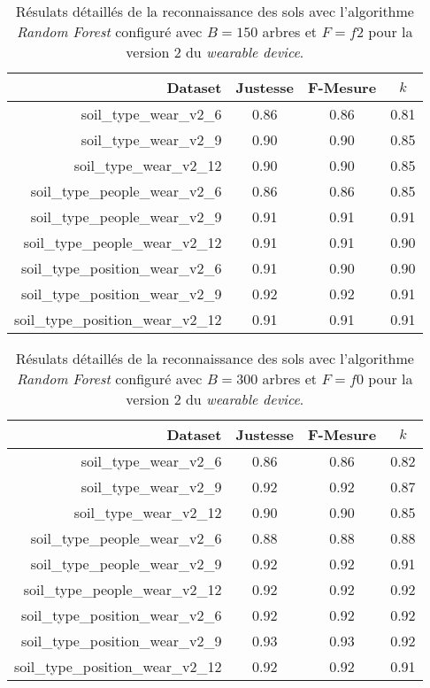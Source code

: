 \begin{table}[H]\renewcommand{\arraystretch}{0.5}
	\centering
	\caption{Résulats détaillés de la reconnaissance des sols avec l'algorithme \textit{Random Forest} configuré avec $B=150$ arbres et $F=f2$ pour la version 2 du \textit{wearable device}.}
	\label{tab:tab:rf-150-f2-wear-v2}
	\begin{tabular}{@{}rccc@{}}
		\toprule
			\textbf{Dataset} & \textbf{Justesse} & \textbf{F-Mesure} & \textbf{$k$} \\
		\midrule
			soil\_type\_wear\_v2\_6 & 0.86 & 0.86 & 0.81 \\
			soil\_type\_wear\_v2\_9 & 0.90 & 0.90 & 0.85 \\
			soil\_type\_wear\_v2\_12 & 0.90 & 0.90 & 0.85 \\
			soil\_type\_people\_wear\_v2\_6 & 0.86 & 0.86 & 0.85 \\
			soil\_type\_people\_wear\_v2\_9 & 0.91 & 0.91 & 0.91 \\
			soil\_type\_people\_wear\_v2\_12 & 0.91 & 0.91 & 0.90 \\
			soil\_type\_position\_wear\_v2\_6 & 0.91 & 0.90 & 0.90 \\
			soil\_type\_position\_wear\_v2\_9 & 0.92 & 0.92 & 0.91 \\
			soil\_type\_position\_wear\_v2\_12 & 0.91 & 0.91 & 0.91 \\
		\bottomrule
	\end{tabular}
\end{table}

\begin{table}[H]\renewcommand{\arraystretch}{0.5}
	\centering
	\caption{Résulats détaillés de la reconnaissance des sols avec l'algorithme \textit{Random Forest} configuré avec $B=300$ arbres et $F=f0$ pour la version 2 du \textit{wearable device}.}
	\label{tab:tab:rf-300-f0-wear-v2}
	\begin{tabular}{@{}rccc@{}}
		\toprule
			\textbf{Dataset} & \textbf{Justesse} & \textbf{F-Mesure} & \textbf{$k$} \\
		\midrule
			soil\_type\_wear\_v2\_6 & 0.86 & 0.86 & 0.82 \\
			soil\_type\_wear\_v2\_9 & 0.92 & 0.92 & 0.87 \\
			soil\_type\_wear\_v2\_12 & 0.90 & 0.90 & 0.85 \\
			soil\_type\_people\_wear\_v2\_6 & 0.88 & 0.88 & 0.88 \\
			soil\_type\_people\_wear\_v2\_9 & 0.92 & 0.92 & 0.91 \\
			soil\_type\_people\_wear\_v2\_12 & 0.92 & 0.92 & 0.92 \\
			soil\_type\_position\_wear\_v2\_6 & 0.92 & 0.92 & 0.92 \\
			soil\_type\_position\_wear\_v2\_9 & 0.93 & 0.93 & 0.92 \\
			soil\_type\_position\_wear\_v2\_12 & 0.92 & 0.92 & 0.91 \\
		\bottomrule
	\end{tabular}
\end{table}


